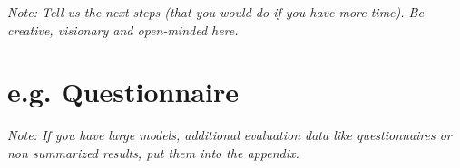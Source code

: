 \documentclass[a4paper,12pt,twoside]{report}
\begin{document}
\textit{Note: Tell us the next steps  (that you would do if you have more time). Be creative, visionary and open-minded here.}



\appendix

\chapter{e.g. Questionnaire}

\textit{Note: If you have large models, additional evaluation data like questionnaires or non summarized results, put them into the appendix.}


\clearpage

\listoffigures
\clearpage

\listoftables
\clearpage



\end{document}
